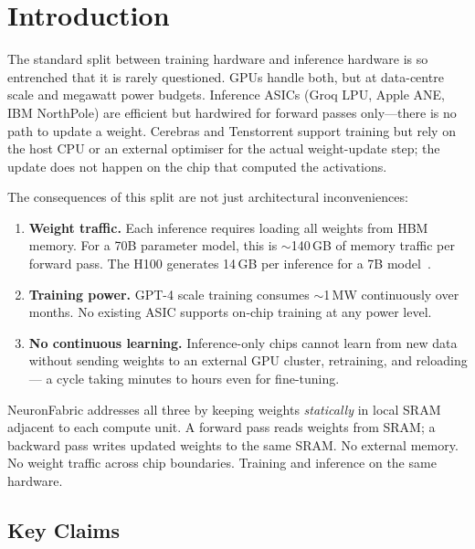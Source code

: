 \documentclass[11pt]{article}
\begin{document}
\section{Introduction}

The standard split between training hardware and inference hardware is so entrenched
that it is rarely questioned. GPUs handle both, but at data-centre scale and megawatt
power budgets. Inference ASICs (Groq LPU, Apple ANE, IBM NorthPole) are efficient
but hardwired for forward passes only---there is no path to update a weight. Cerebras
and Tenstorrent support training but rely on the host CPU or an external optimiser
for the actual weight-update step; the update does not happen on the chip that
computed the activations.

The consequences of this split are not just architectural inconveniences:

\begin{enumerate}
\item \textbf{Weight traffic.} Each inference requires loading all weights from HBM memory.
  For a 70B parameter model, this is $\sim$140\,GB of memory traffic per forward pass.
  The H100 generates 14\,GB per inference for a 7B model~\cite{nvidiagpu}.

\item \textbf{Training power.} GPT-4 scale training consumes $\sim$1\,MW continuously over
  months. No existing ASIC supports on-chip training at any power level.

\item \textbf{No continuous learning.} Inference-only chips cannot learn from new data
  without sending weights to an external GPU cluster, retraining, and reloading---
  a cycle taking minutes to hours even for fine-tuning.
\end{enumerate}

NeuronFabric addresses all three by keeping weights \emph{statically} in local SRAM
adjacent to each compute unit. A forward pass reads weights from SRAM; a backward pass
writes updated weights to the same SRAM. No external memory. No weight traffic across
chip boundaries. Training and inference on the same hardware.

\subsection{Key Claims}
\end{document}
